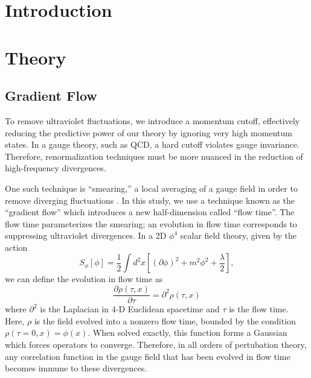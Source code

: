 \documentclass[12pt]{report}
\begin{document}
\chapter{Introduction}



\chapter{Theory}
\section{Gradient Flow}
To remove ultraviolet fluctuations, we introduce a momentum cutoff, effectively reducing the predictive power of our theory by ignoring very high momentum states. In a gauge theory, such as QCD, a hard cutoff violates gauge invariance. Therefore, renormalization techniques must be more nuanced in the reduction of high-frequency divergences. 

One such technique is ``smearing,'' a local averaging of a gauge field in order to remove diverging fluctuations \cite{solbrig2007}. In this study, we use a technique known as the ``gradient flow'' \cite{monahan2015} which introduces a new half-dimension called ``flow time''. The flow time parameterizes the smearing; an evolution in flow time corresponds to suppressing ultraviolet divergences. In a 2D $\phi^4$ scalar field theory, given by the action
\begin{equation}
    S_\phi [\phi] = \frac{1}{2}\int d^2x\left[(\partial \phi)^2+m^2\phi^2+\frac{\lambda}{2}\right],
\end{equation}
we can define the evolution in flow time as
\begin{equation}
    \frac{\partial \rho(\tau, x)}{\partial \tau} = \partial^2 \rho(\tau,x)
\end{equation}
where $\partial^2$ is the Laplacian in 4-D Euclidean spacetime and $\tau$ is the flow time. Here, $\rho$ is the field evolved into a nonzero flow time, bounded by the condition $\rho(\tau=0,x) = \phi(x)$. When solved exactly, this function forms a Gaussian which forces operators to converge. Therefore, in all orders of pertubation theory, any correlation function in the gauge field that has been evolved in flow time becomes immune to these divergences\cite{makino2015a}.
\end{document}
